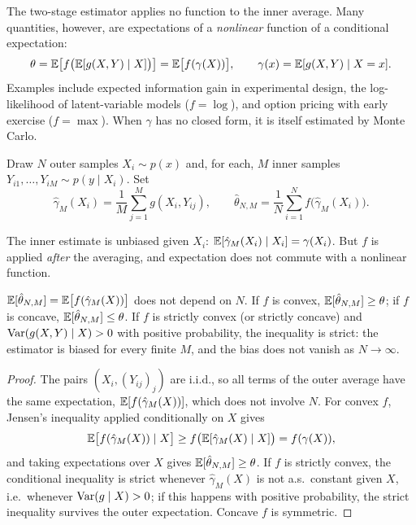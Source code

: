 \begin{notechapter}
The two-stage estimator applies no function to the inner average. Many quantities,
however, are expectations of a \emph{nonlinear} function of a conditional
expectation:
\[
  \theta = \mathbb{E}\bigl[f\bigl(\mathbb{E}[g(X,Y)\mid X]\bigr)\bigr]
  = \mathbb{E}\bigl[f(\gamma(X))\bigr],\qquad \gamma(x) = \mathbb{E}[g(X,Y)\mid X = x].
\]
Examples include expected information gain in experimental design, the
log-likelihood of latent-variable models ($f = \log$), and option pricing with
early exercise ($f = \max$). When $\gamma$ has no closed form, it is itself
estimated by Monte Carlo.

\begin{definition}
Draw $N$ outer samples $X_i\sim p(x)$ and, for each, $M$ inner samples
$Y_{i1},\dots,Y_{iM}\sim p(y\mid X_i)$. Set
\[
  \hat\gamma_M(X_i) = \frac1M\sum_{j=1}^Mg(X_i,Y_{ij}),\qquad
  \hat\theta_{N,M} = \frac1N\sum_{i=1}^Nf\bigl(\hat\gamma_M(X_i)\bigr).
\]
\end{definition}

The inner estimate is unbiased given $X_i$: $\mathbb{E}[\hat\gamma_M(X_i)\mid X_i] = \gamma(X_i)$.
But $f$ is applied \emph{after} the averaging, and expectation does not commute
with a nonlinear function.

\begin{theorem}\label{monte-carlo:thm:bias}
$\mathbb{E}[\hat\theta_{N,M}] = \mathbb{E}\bigl[f(\hat\gamma_M(X))\bigr]$ does not depend on $N$.
If $f$ is convex, $\mathbb{E}[\hat\theta_{N,M}]\geq\theta$; if $f$ is concave,
$\mathbb{E}[\hat\theta_{N,M}]\leq\theta$. If $f$ is strictly convex (or strictly concave)
and $\operatorname{Var}(g(X,Y)\mid X)>0$ with positive probability, the inequality is strict:
the estimator is biased for every finite $M$, and the bias does not vanish as
$N\to\infty$.
\end{theorem}

\begin{proof}
The pairs $(X_i, (Y_{ij})_j)$ are i.i.d., so all terms of the outer average have
the same expectation, $\mathbb{E}[f(\hat\gamma_M(X))]$, which does not involve $N$. For
convex $f$, Jensen's inequality applied conditionally on $X$ gives
\[
  \mathbb{E}\bigl[f(\hat\gamma_M(X))\mid X\bigr]\geq f\bigl(\mathbb{E}[\hat\gamma_M(X)\mid X]\bigr) = f(\gamma(X)),
\]
and taking expectations over $X$ gives $\mathbb{E}[\hat\theta_{N,M}]\geq\theta$. If $f$ is
strictly convex, the conditional inequality is strict whenever
$\hat\gamma_M(X)$ is not a.s.\ constant given $X$, i.e.\ whenever
$\operatorname{Var}(g\mid X)>0$; if this happens with positive probability, the strict
inequality survives the outer expectation. Concave $f$ is symmetric.
\end{proof}


\end{notechapter}
